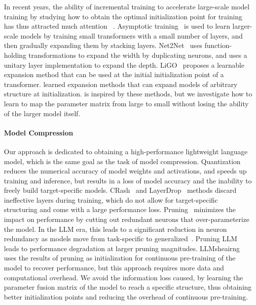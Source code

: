 In recent years, the ability of incremental training to accelerate large-scale model training by studying how to obtain the optimal initialization point for training has thus attracted much attention ~\cite{DBLP:conf/cvpr/XieXP17,DBLP:conf/nips/WuW019}. Asymptotic training~\cite{zhangAcceleratingTrainingTransformerBased2020} is used to learn larger-scale models by training small transformers with a small number of layers, and then gradually expanding them by stacking layers. Net2Net~\cite{chen2015net2net} uses function-holding transformations to expand the width by duplicating neurons, and uses a unitary layer implementation to expand the depth. LiGO~\cite{wangLearningGrowPretrained2023} proposes a learnable expansion method that can be used at the initial initialization point of a transformer. learned expansion methods that can expand models of arbitrary structure at initialization. \aname is inspired by these methods, but we investigate how to learn to map the parameter matrix from large to small without losing the ability of the larger model itself.

\paragraph{Model Compression}
Our approach is dedicated to obtaining a high-performance lightweight language model, which is the same goal as the task of model compression. Quantization~\cite{gray1998quantization} reduces the numerical accuracy of model weights and activations, and speeds up training and inference, but results in a loss of model accuracy and the inability to freely build target-specific models. CRash~\cite{zhangCRaShClusteringRemoving2023} and LayerDrop~\cite{zhang2020accelerating,sajjad2023effect} methods discard ineffective layers during training, which do not allow for target-specific structuring and come with a large performance loss. Pruning~\cite{wangStructuredPruningLarge2020a} minimizes the impact on performance by cutting out redundant neurons that over-parameterize the model. In the LLM era, this leads to a significant reduction in neuron redundancy as models move from task-specific to generalized~\cite{frantarSparseGPTMassiveLanguage2023}. Pruning LLM leads to performance degradation at larger pruning magnitudes. LLMsheairng~\cite{xiaShearedLLaMAAccelerating2023} uses the results of pruning as initialization for continuous pre-training of the model to recover performance, but this approach requires more data and computational overhead. We avoid the information loss caused, by learning the parameter fusion matrix of the model to reach a specific structure, thus obtaining better initialization points and reducing the overhead of continuous pre-training.

%